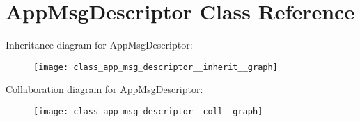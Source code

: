 \hypertarget{class_app_msg_descriptor}{}\section{App\+Msg\+Descriptor Class Reference}
\label{class_app_msg_descriptor}


Inheritance diagram for App\+Msg\+Descriptor\+:
\nopagebreak
\begin{figure}[H]
\begin{center}
\leavevmode
\texttt{[image: class\_app\_msg\_descriptor\_\_inherit\_\_graph]}
\end{center}
\end{figure}


Collaboration diagram for App\+Msg\+Descriptor\+:
\nopagebreak
\begin{figure}[H]
\begin{center}
\leavevmode
\texttt{[image: class\_app\_msg\_descriptor\_\_coll\_\_graph]}
\end{center}
\end{figure}
